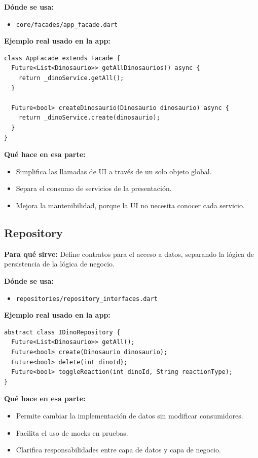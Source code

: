 \documentclass[12pt,a4paper]{article}
\begin{document}
\textbf{Dónde se usa:}
\begin{itemize}
    \item \texttt{core/facades/app_facade.dart}
\end{itemize}

\textbf{Ejemplo real usado en la app:}
\begin{lstlisting}
class AppFacade extends Facade {
  Future<List<Dinosaurio>> getAllDinosaurios() async {
    return _dinoService.getAll();
  }

  Future<bool> createDinosaurio(Dinosaurio dinosaurio) async {
    return _dinoService.create(dinosaurio);
  }
}
\end{lstlisting}

\textbf{Qué hace en esa parte:}
\begin{itemize}
    \item Simplifica las llamadas de UI a través de un solo objeto global.
    \item Separa el consumo de servicios de la presentación.
    \item Mejora la mantenibilidad, porque la UI no necesita conocer cada servicio.
\end{itemize}

\subsection{Repository}
\textbf{Para qué sirve:} Define contratos para el acceso a datos, separando la lógica de persistencia de la lógica de negocio.

\textbf{Dónde se usa:}
\begin{itemize}
    \item \texttt{repositories/repository_interfaces.dart}
\end{itemize}

\textbf{Ejemplo real usado en la app:}
\begin{lstlisting}
abstract class IDinoRepository {
  Future<List<Dinosaurio>> getAll();
  Future<bool> create(Dinosaurio dinosaurio);
  Future<bool> delete(int dinoId);
  Future<bool> toggleReaction(int dinoId, String reactionType);
}
\end{lstlisting}

\textbf{Qué hace en esa parte:}
\begin{itemize}
    \item Permite cambiar la implementación de datos sin modificar consumidores.
    \item Facilita el uso de mocks en pruebas.
    \item Clarifica responsabilidades entre capa de datos y capa de negocio.
\end{itemize}
\end{document}
